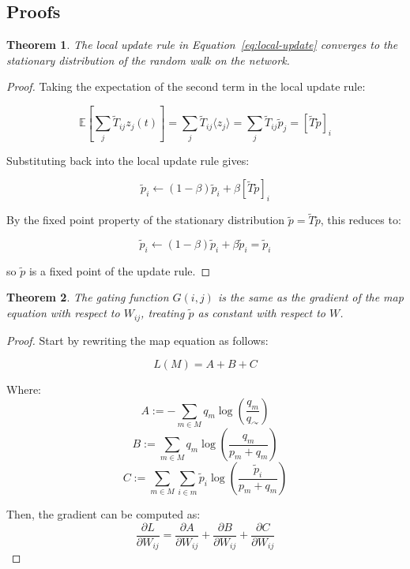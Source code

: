 \documentclass[pdflatex,sn-mathphys-num]{sn-jnl}%
\theoremstyle{thmstyleone}%
\newtheorem{theorem}{Theorem}%
\theoremstyle{thmstyletwo}%
\theoremstyle{thmstylethree}%
\begin{document}
\begin{appendices}

\section{Proofs}\label{sec:proofs}

\begin{theorem}
\label{thm:convergence}
The local update rule in Equation~\ref{eq:local-update} converges to the stationary distribution of the random walk on the network.
\end{theorem}

\begin{proof}
Taking the expectation of the second term in the local update rule:

$$\mathbb{E}\left[\sum_j \tilde{T}_{ij} z_j(t)\right] = \sum_j \tilde{T}_{ij} \langle z_j \rangle = \sum_j \tilde{T}_{ij} \tilde{p}_j = [\tilde{T}\tilde{p}]_i$$

Substituting back into the local update rule gives:

$$\tilde{p}_i \leftarrow (1-\beta) \tilde{p}_i + \beta [\tilde{T}\tilde{p}]_i$$

By the fixed point property of the stationary distribution $\tilde{p} = \tilde{T}\tilde{p}$, this reduces to:

$$\tilde{p}_i \leftarrow (1-\beta)\tilde{p}_i + \beta\tilde{p}_i = \tilde{p}_i$$

so $\tilde{p}$ is a fixed point of the update rule.
\end{proof}

\begin{theorem}
\label{thm:map-derivation}
The gating function $G(i, j)$ is the same as the gradient of the map equation with respect to $W_{ij}$, treating $\tilde{p}$ as constant with respect to $W$.
\end{theorem}

\begin{proof}
Start by rewriting the map equation as follows:

$$L(M) = A + B + C$$

Where:
$$A := -\sum_{m \in M} q_m \log \left( \frac{q_m}{q_{\curvearrowright}} \right)$$
$$B := \sum_{m \in M} q_m \log \left( \frac{q_m}{p_m + q_m} \right)$$
$$C := \sum_{m \in M} \sum_{i \in m} \tilde{p}_i \log \left( \frac{\tilde{p}_i}{p_m + q_m} \right)$$

Then, the gradient can be computed as:
$$\frac{\partial L}{\partial W_{ij}} = \frac{\partial A}{\partial W_{ij}} + \frac{\partial B}{\partial W_{ij}} + \frac{\partial C}{\partial W_{ij}}$$


\end{proof}
\end{appendices}
\end{document}
